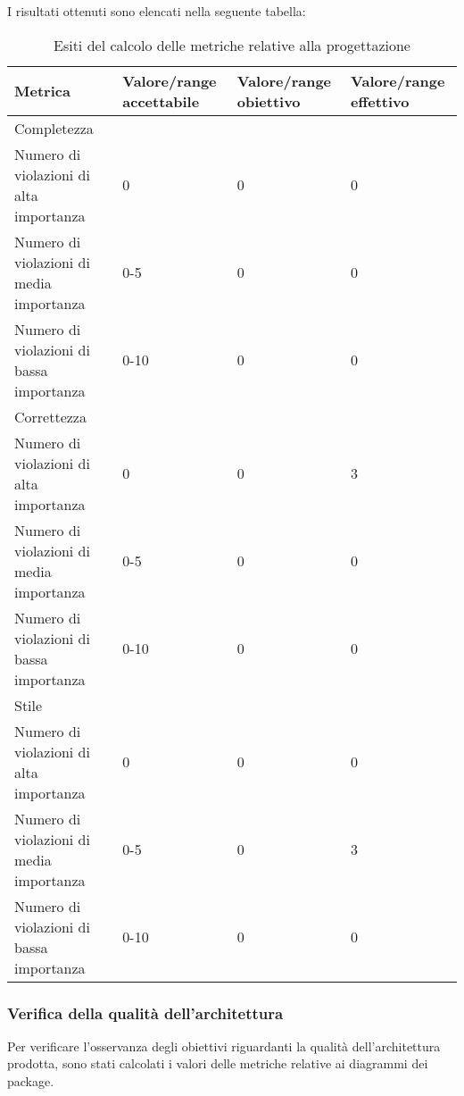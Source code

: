 		I risultati ottenuti sono elencati nella seguente tabella:
		\begin{table}[H]
		\begin{tabular}{|l|p{2.25cm}|p{2.25cm}|p{2.25cm}|}
		\hline
		\textbf{Metrica} & \textbf{Valore/range accettabile} & \textbf{Valore/range obiettivo} & \textbf{Valore/range effettivo} \\
		\hline
		Completezza & ~ & ~ & ~ \\
		Numero di violazioni di alta importanza &0 & 0 &0 \\
		Numero di violazioni di media importanza &0-5 & 0 & 0 \\
		Numero di violazioni di bassa importanza &0-10 & 0 & 0 \\
		\hline
		Correttezza & ~ & ~ & ~ \\
		Numero di violazioni di alta importanza &0 & 0 & 3 \\
		Numero di violazioni di media importanza &0-5 & 0 & 0 \\
		Numero di violazioni di bassa importanza &0-10 & 0 & 0 \\
		\hline
		Stile & ~ & ~ & ~ \\
		Numero di violazioni di alta importanza &0 & 0 & 0 \\
		Numero di violazioni di media importanza &0-5 & 0 & 3 \\
		Numero di violazioni di bassa importanza &0-10 & 0 & 0 \\
		\hline
		\end{tabular}
		\caption{Esiti del calcolo delle metriche relative alla progettazione}
		\end{table}
		
		\subsubsection{Verifica della qualità dell'architettura}
		Per verificare l'osservanza degli obiettivi riguardanti la qualità dell'architettura prodotta, sono stati calcolati i valori delle metriche relative ai diagrammi dei package.
		
